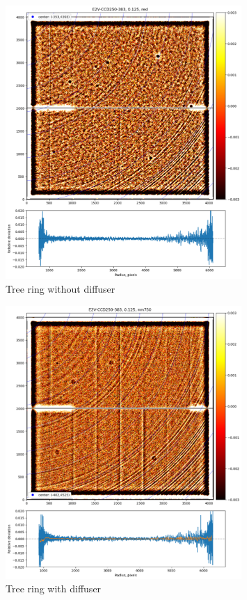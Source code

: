 \begin{figure}[ht]
\centering
\includegraphics[width=0.8\textwidth]{figures/TR_wo_diffuser.png}
\caption{Tree ring without diffuser}
\label{fig:tree_ring_nodiffuser}
\end{figure}


\begin{figure}[ht]
\centering
\includegraphics[width=0.8\textwidth]{figures/TR_w_diffuser.png}
\caption{Tree ring with diffuser}
\label{fig:tree_ring_diffuser}
\end{figure}

